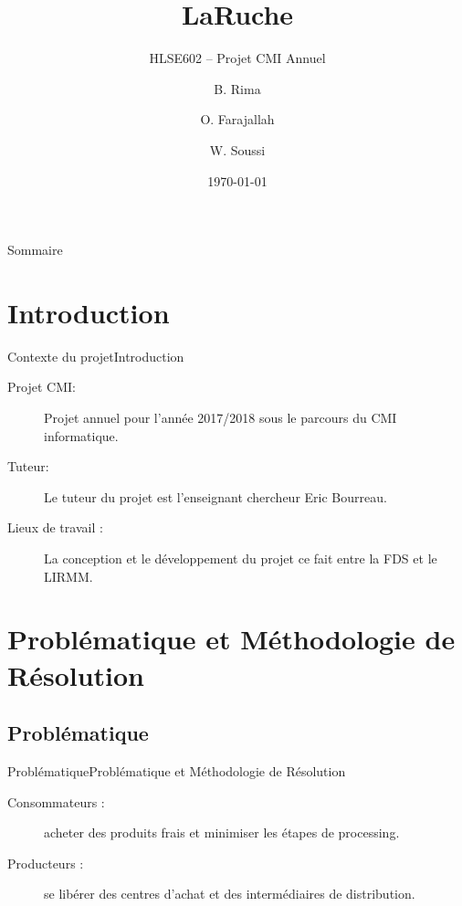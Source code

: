 \documentclass{beamer}
\title{LaRuche}
\subtitle{HLSE602 -- Projet CMI Annuel}
\author{B. Rima \and O. Farajallah \and W. Soussi}
\institute[UM]{L3 CMI Informatique}
\date{\today}
\begin{document}
\begin{frame}
\titlepage
\end{frame}
\begin{frame}{Sommaire}
\tableofcontents
\end{frame}
\section{Introduction}
\begin{frame}{Contexte du projet}{Introduction}
  \begin{description}
    \item[Projet CMI:] Projet annuel pour l'année 2017/2018 sous le parcours du CMI informatique.
    \item[Tuteur:] Le tuteur du projet est l'enseignant chercheur Eric Bourreau.
    \item[Lieux de travail :] La conception et le développement du projet ce fait entre la FDS et le LIRMM.
  \end{description}
\end{frame}

\section{Problématique et Méthodologie de Résolution}
\subsection{Problématique}
\begin{frame}{Problématique}{Problématique et Méthodologie de Résolution}
  \begin{description}
    \item[Consommateurs :] acheter des produits frais et minimiser les étapes de processing.
    \item[Producteurs :] se libérer des centres d'achat et des intermédiaires de distribution.
  \end{description}
\end{frame}
\end{document}
